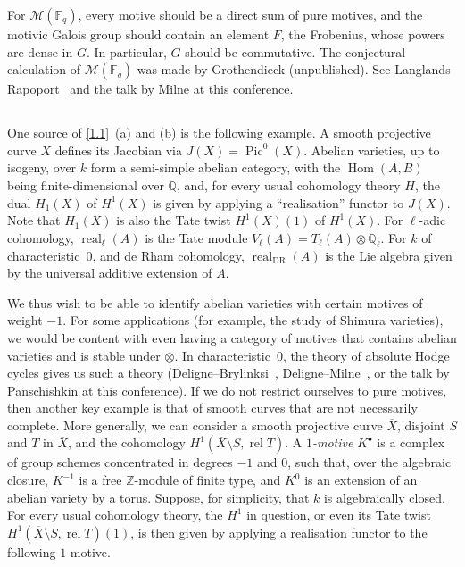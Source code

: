 \documentclass{article}
\theoremstyle{plain}
\theoremstyle{definition}
\newcommand{\sh}[1]{{\mathscr{#1}}}
\newcommand{\ZZ}{\mathbb{Z}}
\newcommand{\QQ}{\mathbb{Q}}
\newcommand{\FF}{\mathbb{F}}
\DeclareMathOperator{\Pic}{Pic}
\DeclareMathOperator{\Hom}{Hom}
\DeclareMathOperator{\real}{real}
\newcommand{\oldpage}[1]{\marginpar{\footnotesize$\Big\vert$ \textit{p.~#1}}}
\begin{document}
For $\sh{M}(\FF_q)$, every motive should be a direct sum of pure motives, and the motivic Galois group should contain an element $F$, the Frobenius, whose powers are dense in $G$.
In particular, $G$ should be commutative.
The conjectural calculation of $\sh{M}(\FF_q)$ was made by Grothendieck (unpublished).
See Langlands--Rapoport~\cite{23} and the talk by Milne at this conference.


\subsection{}
\label{1.5}

One source of \cref{1.1}~(a) and (b) is the following example.
A smooth projective curve $X$ defines its Jacobian via $J(X)=\Pic^0(X)$.
Abelian varieties, up to isogeny, over $k$ form a semi-simple abelian category, with the $\Hom(A,B)$ being finite-dimensional over $\QQ$, and, for every usual cohomology theory $H$, the dual $H_1(X)$ of $H^1(X)$ is given by applying a ``realisation'' functor to $J(X)$.
Note that $H_1(X)$ is also the Tate twist $H^1(X)(1)$ of $H^1(X)$.
For $\ell$-adic cohomology, $\real_\ell(A)$ is the Tate module $V_\ell(A)=T_\ell(A)\otimes\QQ_\ell$.
For $k$ of characteristic~$0$, and
\oldpage{148}
de Rham cohomology, $\real_{\mathrm{DR}}(A)$ is the Lie algebra given by the universal additive extension of $A$.

We thus wish to be able to identify abelian varieties with certain motives of weight $-1$.
For some applications (for example, the study of Shimura varieties), we would be content with even having a category of motives that contains abelian varieties and is stable under $\otimes$.
In characteristic~$0$, the theory of absolute Hodge cycles gives us such a theory (Deligne--Brylinksi~\cite{11}, Deligne--Milne~\cite{12}, or the talk by Panschishkin at this conference).
If we do not restrict ourselves to pure motives, then another key example is that of smooth curves that are not necessarily complete.
More generally, we can consider a smooth projective curve $\overline{X}$, disjoint $S$ and $T$ in $\overline{X}$, and the cohomology $H^1(\overline{X}\setminus S,\operatorname{rel}T)$.
A \emph{$1$-motive} $K^\bullet$ is a complex of group schemes concentrated in degrees $-1$ and $0$, such that, over the algebraic closure, $K^{-1}$ is a free $\ZZ$-module of finite type, and $K^0$ is an extension of an abelian variety by a torus.
Suppose, for simplicity, that $k$ is algebraically closed.
For every usual cohomology theory, the $H^1$ in question, or even its Tate twist $H^1(\overline{X}\setminus S,\operatorname{rel}T)(1)$, is then given by applying a realisation functor to the following $1$-motive.
\end{document}
